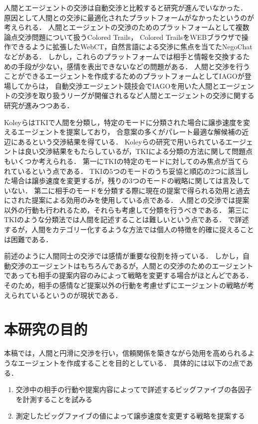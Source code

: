 人間とエージェントの交渉は自動交渉と比較すると研究が進んでいなかった．
原因として人間との交渉に最適化されたプラットフォームがなかったというのが考えられる．
人間とエージェントの交渉のためのプラットフォームとして複数論点交渉問題について扱うColored Trails\cite{ct}，
Colored TrailsをWEBブラウザで操作できるように拡張したWebCT\cite{webct}，自然言語による交渉に焦点を当てたNegoChat\cite{negochat}などがある．
しかし，これらのプラットフォームでは相手と情報を交換するための手段が少ない，感情を表出できないなどの問題がある\cite{pinocchio}．
人間と交渉を行うことができるエージェントを作成するためのプラットフォームとしてIAGO\cite{pinocchio, iago}が登場してからは，
自動交渉エージェント競技会でIAGOを用いた人間とエージェントの交渉を取り扱うリーグが開催されるなど人間とエージェントの交渉に関する研究が進みつつある\cite{hal-2017, hal-2018, hal-2019}．

Koleyら\cite{tki-ha}はTKI\cite{tki}で人間を分類し，特定のモードに分類された場合に譲歩速度を変えるエージェントを提案しており，
合意案の多くがパレート最適な解候補の近辺にあるという交渉結果を得ている．
Koleyらの研究で用いられているエージェントは良い交渉結果をもたらしているが，TKIによる分類の方法に関して問題点もいくつか考えられる．
第一にTKIの特定のモードに対してのみ焦点が当てられているという点である．
TKIの5つのモードのうち妥協と順応の2つに該当した場合は譲歩速度を変更するが，残りの3つのモードの戦略に関しては言及していない．
第二に相手のモードを分類する際に現在の提案で得られる効用と過去にされた提案による効用のみを使用している点である．
人間との交渉では提案以外の行動も行われるため，それらも考慮して分類を行うべきである．
第三にTKIのような分類法では人間を記述することは難しいという点である．
で詳述するが，人間をカテゴリー化するような方法では個人の特徴を的確に捉えることは困難である．

前述のように人間同士の交渉では感情が重要な役割を持っている．
しかし，自動交渉のエージェントはもちろんであるが，人間との交渉のためのエージェントであっても相手の提案内容のみによって戦略を変更する場合がほとんどである．
そのため，相手の感情など提案以外の行動を考慮せずにエージェントの戦略が考えられているというのが現状である．

\section{本研究の目的}
本稿では，人間と円滑に交渉を行い，信頼関係を築きながら効用を高められるようなエージェントを作成することを目的としている．
具体的には以下の2点である．

\begin{enumerate}
    \item 交渉中の相手の行動や提案内容によってで詳述するビッグファイブの各因子を計測することを試みる
    \item 測定したビッグファイブの値によって譲歩速度を変更する戦略を提案する
\end{enumerate}

